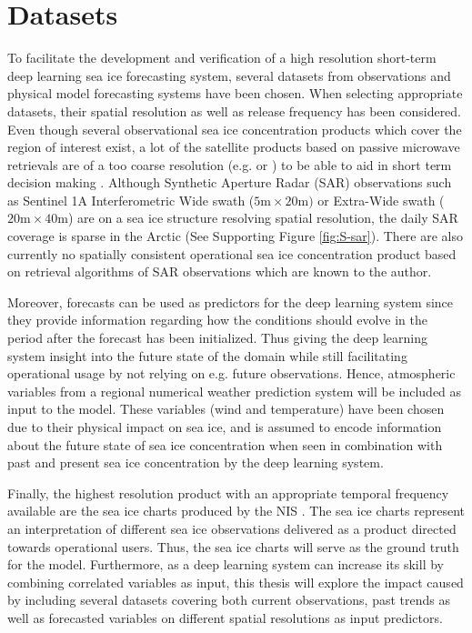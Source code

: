 \documentclass[../main/thesis.tex]{subfiles}
\begin{document}
\section{Datasets}
\label{sec:datasets}
To facilitate the development and verification of a high resolution short-term deep learning sea ice forecasting system, several datasets from observations and physical model forecasting systems have been chosen. When selecting appropriate datasets, their spatial resolution as well as release frequency has been considered. Even though several observational sea ice concentration products which cover the region of interest exist, a lot of the satellite products based on passive microwave retrievals are of a too coarse resolution (e.g. \citet{Lavergne2019} or \citet{Kern2019}) to be able to aid in short term decision making \citep{Wagner2020}. Although Synthetic Aperture Radar (SAR) observations such as Sentinel 1A Interferometric Wide swath ($5\text{m} \times 20\text{m})$ or Extra-Wide swath ($20\text{m} \times 40\text{m}$) are on a sea ice structure resolving spatial resolution, the daily SAR coverage is sparse in the Arctic (See Supporting Figure \ref{fig:S-sar}). There are also currently no spatially consistent operational sea ice concentration product based on retrieval algorithms of SAR observations which are known to the author.

Moreover, forecasts can be used as predictors for the deep learning system since they provide information regarding how the conditions should evolve in the period after the forecast has been initialized. Thus giving the deep learning system insight into the future state of the domain while still facilitating operational usage by not relying on e.g. future observations. Hence, atmospheric variables from a regional numerical weather prediction system will be included as input to the model. These variables (wind and temperature) have been chosen due to their physical impact on sea ice, and is assumed to encode information about the future state of sea ice concentration when seen in combination with past and present sea ice concentration by the deep learning system.

Finally, the highest resolution product with an appropriate temporal frequency available are the sea ice charts produced by the NIS \citep{Dinessen2020}. The sea ice charts represent an interpretation of different sea ice observations delivered as a product directed towards operational users. Thus, the sea ice charts will serve as the ground truth for the model. Furthermore, as a deep learning system can increase its skill by combining correlated variables as input, this thesis will explore the impact caused by including several datasets covering both current observations, past trends as well as forecasted variables on different spatial resolutions as input predictors.
\end{document}
